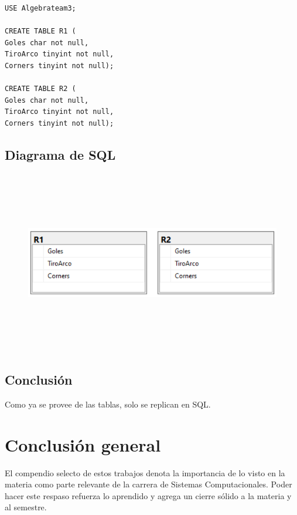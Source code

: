 \documentclass[a4paper, 12pt]{article}
\begin{document}
\begin{justify}
\begin{verbatim}
USE Algebrateam3;
    
CREATE TABLE R1 (
Goles char not null,
TiroArco tinyint not null,
Corners tinyint not null);

CREATE TABLE R2 (
Goles char not null,
TiroArco tinyint not null,
Corners tinyint not null); 
\end{verbatim}   
        \subsection{Diagrama de SQL}
        \begin{figure}[H]
            \centering
            \includegraphics[width=12cm,height=8cm]{sql_u5t3_3.PNG}
        \end{figure}
        \subsection{Conclusión}
        \justify
        Como ya se provee de las tablas, solo se replican en SQL.
        \section*{Conclusión general}
        \justify
        El compendio selecto de estos trabajos denota la importancia de lo visto en la materia como parte relevante de la carrera de Sistemas Computacionales.
        Poder hacer este respaso refuerza lo aprendido y agrega un cierre sólido a la materia y al semestre.

    \end{justify}
\end{document}

